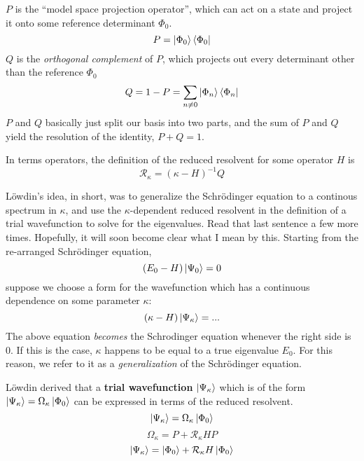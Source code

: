 \documentclass{article}
\begin{document}
$P$ is the ``model space projection operator'', which can act on a state 
    and project it onto some reference determinant $\Phi_0$.
\[P = \ket{\Phi_0}\bra{\Phi_0}  \]
$Q$ is the \textit{orthogonal complement} of $P$, which projects out every determinant other than the reference $\Phi_0$
\[Q = 1 - P = \sum_{n \neq 0}  \ket{\Phi_n}\bra{\Phi_n}\]
$P$ and $Q$ basically just split our basis into two parts, and the sum of $P$ and $Q$ yield the resolution of the identity, $P + Q = 1$.

In terms operators, the definition of the reduced resolvent for some operator $H$ is
\[\mathcal{R}_{\kappa} = (\kappa - H)^{-1} Q  \]

L{\"o}wdin's idea, in short, was to generalize the Schr{\"o}dinger equation
to a continous spectrum in $\kappa$, and use the $\kappa$-dependent reduced resolvent in the definition of 
a trial wavefunction to solve for the eigenvalues. Read that last sentence a few more times. 
Hopefully, it will soon become clear what I mean by this.
Starting from the re-arranged Schr{\"o}dinger equation,
\[(E_0 - H) \ket{\Psi_0} = 0 \]
suppose we choose a form for the wavefunction which has a continuous dependence on some parameter
$\kappa$: 
\[(\kappa - H) \ket{\Psi_{\kappa}} = ... \]
The above equation \textit{becomes} the Schrodinger equation whenever the right side is 0.
If this is the case, $\kappa$ happens to be equal to a true eigenvalue $E_0$.
For this reason, we refer to it as a \textit{generalization} of the Schr{\"o}dinger equation.

L{\"o}wdin derived that a \textbf{trial wavefunction} $\ket{\Psi_{\kappa}}$ 
    which is of the form $\ket{\Psi_\kappa} = \Omega_\kappa \ket{\Phi_0}$
    can be expressed in terms of the reduced resolvent. 
\[\ket{\Psi_\kappa} = \Omega_\kappa \ket{\Phi_0}\]
\[\Omega_{\kappa} = P + \mathcal{R}_{\kappa} H P \]
\[\ket{\Psi_{\kappa}} = \ket{\Phi_0} + \mathcal{R}_{\kappa} H \ket{\Phi_0} \]
\end{document}
